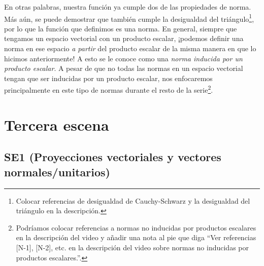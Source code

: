 \documentclass[12pt,dvipsnames]{article}
\numberwithin{equation}{section}
\begin{document}
\noindent En otras palabras, nuestra función ya cumple dos de las propiedades de norma. Más aún, se puede demostrar que también cumple la desigualdad del triángulo\footnote{Colocar referencias de desigualdad de Cauchy-Schwarz y la desigualdad del triángulo en la descripción.}, por lo que la función que definimos es una norma. En general, siempre que tengamos un espacio vectorial con un producto escalar, ¡podemos definir una norma en ese espacio \emph{a partir} del producto escalar de la misma manera en que lo hicimos anteriormente! A esto se le conoce como una \emph{norma inducida por un producto escalar}. A pesar de que no todas las normas en un espacio vectorial tengan que ser inducidas por un producto escalar, nos enfocaremos principalmente en este tipo de normas durante el resto de la serie\footnote{Podríamos colocar referencias a normas no inducidas por productos escalares en la descripción del video y añadir una nota al pie que diga ``Ver referencias [N-1], [N-2], etc. en la descripción del video sobre normas no inducidas por productos escalares.''.}.


\newpage
\section{Tercera escena}

\subsection{SE1 (Proyecciones vectoriales y vectores normales/unitarios)}
\end{document}
